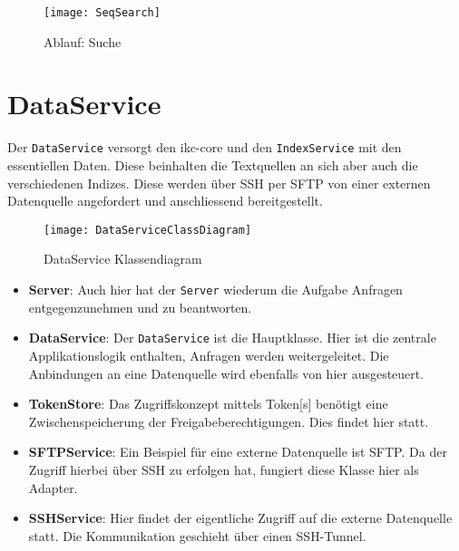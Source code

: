     \begin{figure}[H]
    \centering
    \texttt{[image: SeqSearch]}
    \caption{Ablauf: Suche}
    \label{fig:seqsearch}
    \end{figure}


\section{DataService}

Der \texttt{DataService} versorgt den \gls{ikc-core} und den \texttt{IndexService} mit den essentiellen Daten. Diese beinhalten die Textquellen an sich aber auch die verschiedenen Indizes. Diese werden über \gls{SSH} per \gls{SFTP} von einer externen Datenquelle angefordert und anschliessend bereitgestellt. 

    \begin{figure}[H]
    \centering
    \texttt{[image: DataServiceClassDiagram]}
    \caption{DataService Klassendiagram}
    \label{fig:dataserviceClassDiagram}
    \end{figure}


\begin{itemize}
    \item \textbf{Server}: Auch hier hat der \texttt{Server} wiederum die Aufgabe Anfragen entgegenzunehmen und zu beantworten.
    \item \textbf{DataService}: Der \texttt{DataService} ist die Hauptklasse. Hier ist die zentrale Applikationslogik enthalten, Anfragen werden weitergeleitet. Die Anbindungen an eine Datenquelle wird ebenfalls von hier ausgesteuert.
    \item \textbf{TokenStore}: Das Zugriffskonzept mittels \gls{Token}[s] benötigt eine Zwischenspeicherung der Freigabeberechtigungen. Dies findet hier statt. 
    \item \textbf{SFTPService}: Ein Beispiel für eine externe Datenquelle ist \gls{SFTP}. Da der Zugriff hierbei über \gls{SSH} zu erfolgen hat, fungiert diese Klasse hier als Adapter.
    \item \textbf{SSHService}: Hier findet der eigentliche Zugriff auf die externe Datenquelle statt. Die Kommunikation geschieht über einen \gls{SSH}-Tunnel.
\end{itemize}


